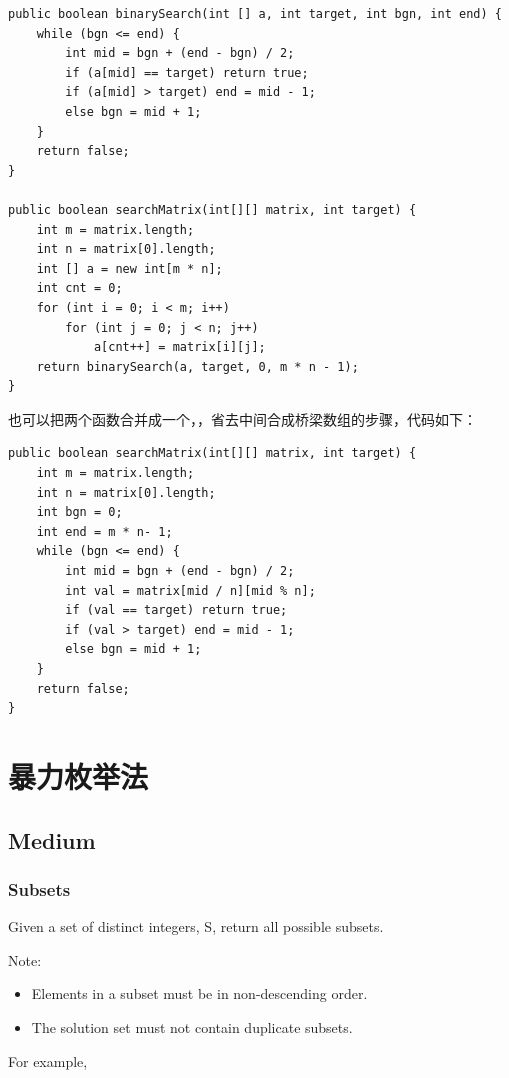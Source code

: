 \documentclass[12pt]{book}
\begin{document}
\lstset{language=java,label= ,caption= ,numbers=none}
\begin{lstlisting}
public boolean binarySearch(int [] a, int target, int bgn, int end) {
    while (bgn <= end) {
        int mid = bgn + (end - bgn) / 2;
        if (a[mid] == target) return true;
        if (a[mid] > target) end = mid - 1;
        else bgn = mid + 1;
    }
    return false;
}
        
public boolean searchMatrix(int[][] matrix, int target) {
    int m = matrix.length;
    int n = matrix[0].length;
    int [] a = new int[m * n];
    int cnt = 0;
    for (int i = 0; i < m; i++) 
        for (int j = 0; j < n; j++) 
            a[cnt++] = matrix[i][j];
    return binarySearch(a, target, 0, m * n - 1);
}
\end{lstlisting}

也可以把两个函数合并成一个，，省去中间合成桥梁数组的步骤，代码如下： 
\lstset{language=java,label= ,caption= ,numbers=none}
\begin{lstlisting}
public boolean searchMatrix(int[][] matrix, int target) {
    int m = matrix.length;
    int n = matrix[0].length;
    int bgn = 0;
    int end = m * n- 1;
    while (bgn <= end) {
        int mid = bgn + (end - bgn) / 2;
        int val = matrix[mid / n][mid % n];
        if (val == target) return true;
        if (val > target) end = mid - 1;
        else bgn = mid + 1;
    }
    return false;
}
\end{lstlisting}

\chapter{暴力枚举法}
\label{sec-9}
\section{Medium}
\label{sec-9-1}
\subsection{Subsets}
\label{sec-9-1-1}
Given a set of distinct integers, S, return all possible subsets.

Note:
\begin{itemize}
\item Elements in a subset must be in non-descending order.
\item The solution set must not contain duplicate subsets.
\end{itemize}
For example,
\end{document}
